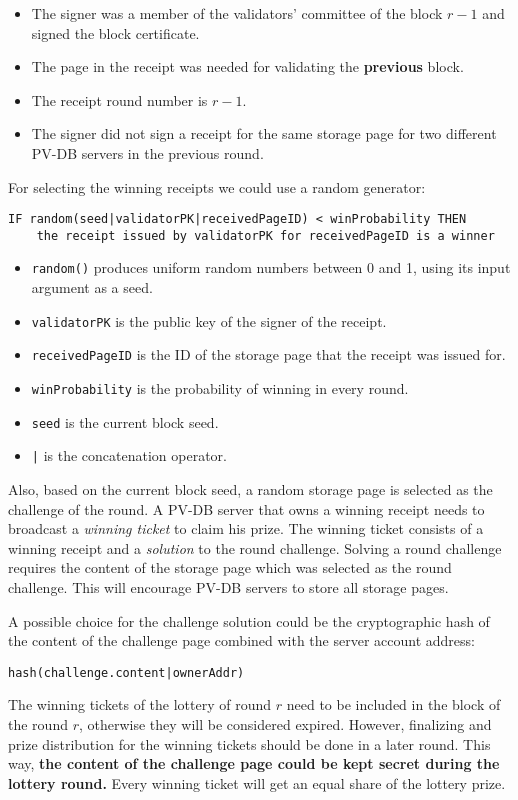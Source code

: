 \begin{itemize}
    \item The signer was a member of the validators' committee of the block $r - 1$ and signed the block certificate.
    \item The page in the receipt was needed for validating the \textbf{previous} block.
    \item The receipt round number is $r - 1$.
    \item The signer did not sign a receipt for the same storage page for two different PV-DB servers in
    the previous round.
\end{itemize}
For selecting the winning receipts we could use a random generator:
\begin{verbatim}
IF random(seed|validatorPK|receivedPageID) < winProbability THEN
    the receipt issued by validatorPK for receivedPageID is a winner
\end{verbatim}
\begin{itemize}
    \item \texttt{random()} produces uniform random numbers between 0 and 1, using its input argument as a seed.
    \item \texttt{validatorPK} is the public key of the signer of the receipt.
    \item \texttt{receivedPageID} is the ID of the storage page that the receipt was issued for.
    \item \texttt{winProbability} is the probability of winning in every round.
    \item \texttt{seed} is the current block seed.
    \item \texttt{|} is the concatenation operator.
\end{itemize}

Also, based on the current block seed, a random storage page is
selected as the challenge of the round. A PV-DB server that owns a winning receipt needs to broadcast a \emph{winning
ticket} to claim his prize. The winning ticket consists of a winning receipt and a \emph{solution} to the round
challenge. Solving a round challenge requires the content of the storage page which was selected as the round
challenge. This will encourage PV-DB servers to store all storage pages.

A possible choice for the challenge solution could be the cryptographic hash of the content of the challenge
page combined with the server account address:

\texttt{hash(challenge.content|ownerAddr)}

The winning tickets of the lottery of round $r$ need to be included in the block of the round $r$,
otherwise they will be considered expired. However, finalizing and prize distribution for the winning tickets
should be done in a later round. This way, \textbf{the content of the challenge page could be
kept secret during the lottery round.} Every winning ticket will get an equal share of the lottery prize.
